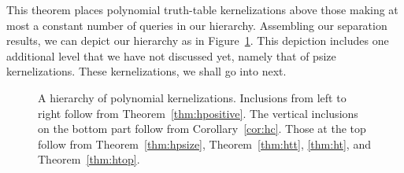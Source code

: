This theorem places polynomial truth-table kernelizations above those making at most a constant number of queries in our hierarchy.
Assembling our separation results, we can depict our hierarchy as in Figure~\ref{fig:kernel_hierarchy}.
This depiction includes one additional level that we have not discussed yet, namely that of psize kernelizations.
These kernelizations, we shall go into next.

\begin{figure}[bp]
  \centering
  \hspace*{-8em}  %
  \caption{
    A hierarchy of polynomial kernelizations.
    Inclusions from left to right follow from Theorem~\ref{thm:hpositive}.
    The vertical inclusions on the bottom part follow from Corollary~\ref{cor:hc}.
    Those at the top follow from Theorem~\ref{thm:hpsize}, Theorem~\ref{thm:htt}, \ref{thm:ht}, and Theorem~\ref{thm:htop}.
  }
  \label{fig:kernel_hierarchy}
\end{figure}
\FloatBarrier%

